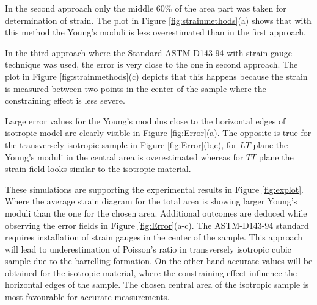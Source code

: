 \documentclass[3p]{elsarticle}
\begin{document}
% 
% 

In the second approach only the middle 60\% of the area part was
taken for determination of strain. The plot in Figure
\ref{fig:strainmethods}(a) shows that with this method the Young's moduli is
less overestimated than in the first approach.\par In the third approach where
the Standard ASTM-D143-94 with strain gauge technique was used, the error is very close to the one in
second approach. The plot in Figure \ref{fig:strainmethods}(c) depicts that
this happens because the strain is measured between two points in the center of 
the sample where the constraining effect is less severe. 

Large error values for the Young's
modulus close to the horizontal edges of isotropic model are clearly visible in
Figure \ref{fig:Error}(a). The opposite is true for the transversely isotropic
sample in Figure \ref{fig:Error}(b,c), for $LT$ plane 
the Young's moduli in the central area is overestimated whereas for $TT$ plane
the strain field looks similar to the isotropic material.\par
These simulations are supporting the experimental results in Figure
\ref{fig:explot}. Where the average strain diagram for the total area is showing larger Young's moduli than
the one for the chosen area.
Additional outcomes are deduced  while observing the error fields in Figure
\ref{fig:Error}(a\textprime-c\textprime). The ASTM-D143-94 standard
\cite{american2009standard} requires installation of strain gauges in the center of the sample. This approach will
lead to underestimation of Poisson's ratio in transversely isotropic cubic
sample due to the barrelling formation. On the other hand accurate values will
be obtained for the isotropic material, where the constraining effect influence
the horizontal edges of the sample. The chosen central area of the isotropic
sample is most favourable for accurate measurements.
\end{document}

